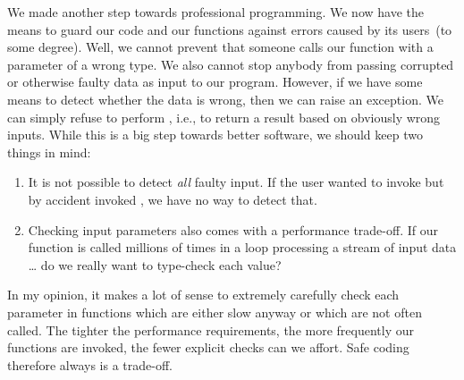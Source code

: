 We made another step towards professional programming.
We now have the means to guard our code and our functions against errors caused by its users~(to some degree).
Well, we cannot prevent that someone calls our function with a parameter of a wrong type.
We also cannot stop anybody from passing corrupted or otherwise faulty data as input to our program.
However, if we have some means to detect whether the data is wrong, then we can raise an exception.
We can simply refuse to perform , i.e., to return a result based on obviously wrong inputs.
While this is a big step towards better software, we should keep two things in mind:%
%
\begin{enumerate}%
%
\item It is not possible to detect \emph{all} faulty input. %
If the user wanted to invoke  but by accident invoked , we have no way to detect that.%
%
\item Checking input parameters also comes with a performance trade-off. %
If our  function is called millions of times in a loop processing a stream of input data {\dots} do we really want to  type-check each value?%
%
\end{enumerate}%
%
In my opinion, it makes a lot of sense to extremely carefully check each parameter in functions which are either slow anyway or which are not often called.
The tighter the performance requirements, the more frequently our functions are invoked, the fewer explicit checks can we affort.
Safe coding therefore always is a trade-off.%
%
\FloatBarrier%
\endhsection%
%
%
%
%
\label{sec:builtInExceptions}%
%

